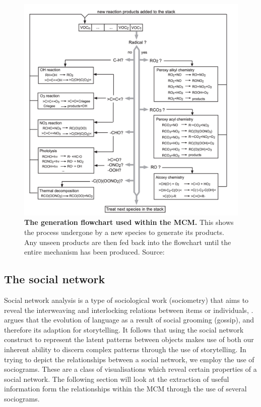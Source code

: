 \begin{figure}[H]
     \centering
         \centering
         \includegraphics[width=.96\textwidth]{figures_c1/generation.png}
         \caption{\textbf{The generation flowchart used within the MCM.} This shows the process undergone by a new species to generate its products. Any unseen products are then fed back into the flowchart until the entire mechanism has been produced.  Source:\citep{protocol}}
         \label{fig:protocol}
     \end{figure}


\subsection{The social network}
Social network analysis is a type of sociological work (sociometry) that aims to reveal the interweaving and interlocking relations between items or individuals, \citep{socialorigin}. \citep{gossip} argues that the evolution of language as a result of social grooming (gossip), and therefore its adaption for storytelling. It follows that using the social network construct to represent the latent patterns between objects makes use of both our inherent ability to discern complex patterns through the use of storytelling. In trying to depict the relationships between a social network, we employ the use of sociograms. These are a class of visualisations which reveal certain properties of a social network. The following section will look at the extraction of useful information form the relationships within the MCM through the use of several sociograms. 

